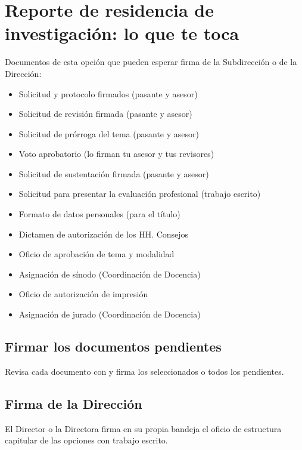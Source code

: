 \section{Reporte de residencia de investigación: lo que te toca}
Documentos de esta opción que pueden esperar firma de la Subdirección o de la Dirección:
\begin{itemize}
  \item Solicitud y protocolo firmados (pasante y asesor)
  \item Solicitud de revisión firmada (pasante y asesor)
  \item Solicitud de prórroga del tema (pasante y asesor)
  \item Voto aprobatorio (lo firman tu asesor y tus revisores)
  \item Solicitud de sustentación firmada (pasante y asesor)
  \item Solicitud para presentar la evaluación profesional (trabajo escrito)
  \item Formato de datos personales (para el título)
  \item Dictamen de autorización de los HH. Consejos
  \item Oficio de aprobación de tema y modalidad
  \item Asignación de sínodo (Coordinación de Docencia)
  \item Oficio de autorización de impresión
  \item Asignación de jurado (Coordinación de Docencia)
\end{itemize}
\subsection{Firmar los documentos pendientes}
Revisa cada documento con  y firma los seleccionados o todos los pendientes.
\subsection{Firma de la Dirección}
El Director o la Directora firma en su propia bandeja el oficio de estructura capitular de las opciones con trabajo escrito.
